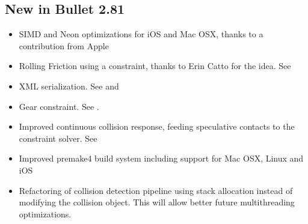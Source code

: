 \subsection{New in Bullet 2.81}
\begin{itemize}
	\item SIMD and Neon optimizations for iOS and Mac OSX, thanks to a contribution from Apple
	\item Rolling Friction using a constraint, thanks to Erin Catto for the idea. See 
	\item XML serialization. See  and 
	\item Gear constraint. See .
	\item Improved continuous collision response, feeding speculative contacts to the constraint solver. See 
	\item Improved premake4 build system including support for Mac OSX, Linux and iOS
	\item Refactoring of collision detection pipeline using stack allocation instead of modifying the collision object. This will allow better future multithreading optimizations.
\end{itemize}

